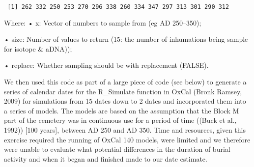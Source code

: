 \documentclass[
]{agujournal2019}
\begin{document}
\begin{verbatim}
 [1] 262 332 250 253 270 296 338 260 334 347 297 313 301 290 312
\end{verbatim}

Where: • x: Vector of numbers to sample from (eg AD 250--350);

• size: Number of values to return (15: the number of inhumations being
sample for isotope \& aDNA));

• replace: Whether sampling should be with replacement (FALSE).

We then used this code as part of a large piece of code (see below) to
generate a series of calendar dates for the R\_Simulate function in
OxCal (Bronk Ramsey, 2009) for simulations from 15 dates down to 2 dates
and incorporated them into a series of models. The models are based on
the assumption that the Block M part of the cemetery was in continuous
use for a period of time ((Buck et al., 1992)) {[}100 years{]}, between
AD 250 and AD 350. Time and resources, given this exercise required the
running of OxCal 140 models, were limited and we therefore were unable
to evaluate what potential differences in the duration of burial
activity and when it began and finished made to our date estimate.
\end{document}
